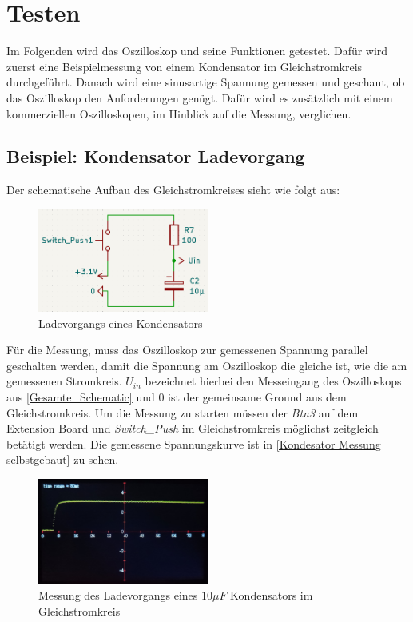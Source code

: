 \section{Testen}
\label{Beispiel-Nutzung}

Im Folgenden wird das Oszilloskop und seine Funktionen getestet.
Dafür wird zuerst eine Beispielmessung von einem Kondensator im Gleichstromkreis durchgeführt. \newline
Danach wird eine sinusartige Spannung gemessen und geschaut, ob das Oszilloskop den Anforderungen genügt.
Dafür wird es zusätzlich mit einem kommerziellen Oszilloskopen, im Hinblick auf die Messung, verglichen.

\subsection{Beispiel: Kondensator Ladevorgang}
\label{Kondensator Ladevorgang}
Der schematische Aufbau des Gleichstromkreises sieht wie folgt aus:
\begin{figure}[h]
	\centering
	\includegraphics[width=0.5\textwidth]{images/schematic_beispielnutzung_kondensator2.png}
	\caption{Ladevorgangs eines Kondensators}
\end{figure}
\newline
Für die Messung, muss das Oszilloskop zur gemessenen Spannung parallel geschalten werden,
damit die Spannung am Oszilloskop die gleiche ist, wie die am gemessenen Stromkreis.
$U_{in}$ bezeichnet hierbei den Messeingang des Oszilloskops aus \ref{Gesamte_Schematic}
und $0$ ist der gemeinsame Ground aus dem Gleichstromkreis.
Um die Messung zu starten müssen der \textit{Btn3} auf dem Extension Board und \textit{Switch\_Push}
im Gleichstromkreis möglichst zeitgleich betätigt werden.
Die gemessene Spannungskurve ist in \autoref{Kondesator Messung selbstgebaut} zu sehen.
\begin{figure}[h!]
	\centering
	\includegraphics[width=0.5\textwidth]{images/messung_kondensator_ladekurve_selbstgebaut2.jpg}
	\caption{Messung des Ladevorgangs eines $10\mu F$ Kondensators im Gleichstromkreis}
	\label{Kondesator Messung selbstgebaut}
\end{figure}
